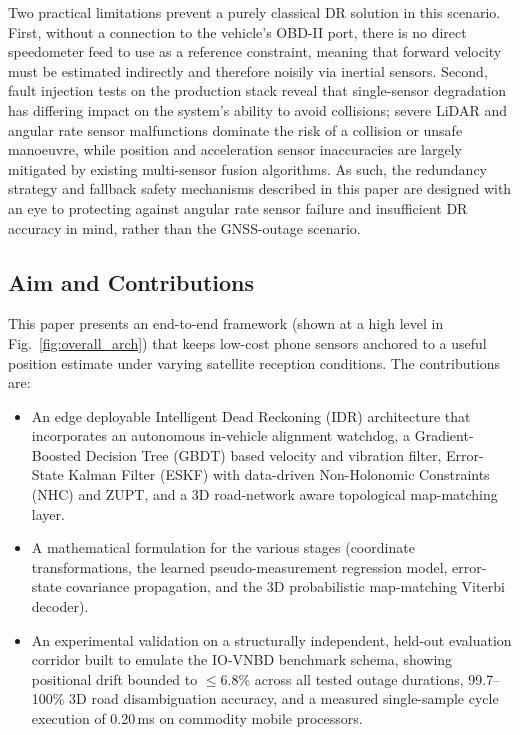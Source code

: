 \documentclass[conference]{IEEEtran}
\begin{document}
Two practical limitations prevent a purely classical DR solution in this scenario. First, without a connection to the vehicle’s OBD-II port, there is no direct speedometer feed to use as a reference constraint, meaning that forward velocity must be estimated indirectly and therefore noisily via inertial sensors. Second, fault injection tests on the production stack reveal that single-sensor degradation has differing impact on the system’s ability to avoid collisions; severe LiDAR and angular rate sensor malfunctions dominate the risk of a collision or unsafe manoeuvre, while position and acceleration sensor inaccuracies are largely mitigated by existing multi-sensor fusion algorithms. As such, the redundancy strategy and fallback safety mechanisms described in this paper are designed with an eye to protecting against angular rate sensor failure and insufficient DR accuracy in mind, rather than the GNSS-outage scenario.



\subsection{Aim and Contributions}

This paper presents an end-to-end framework (shown at a high level in Fig.~\ref{fig:overall_arch}) that keeps low-cost phone sensors anchored to a useful position estimate under varying satellite reception conditions. The contributions are:



\begin{itemize}

\item An edge deployable Intelligent Dead Reckoning (IDR) architecture that incorporates an autonomous in-vehicle alignment watchdog, a Gradient-Boosted Decision Tree (GBDT) based velocity and vibration filter, Error-State Kalman Filter (ESKF) with data-driven Non-Holonomic Constraints (NHC) and ZUPT, and a 3D road-network aware topological map-matching layer.

\item A mathematical formulation for the various stages (coordinate transformations, the learned pseudo-measurement regression model, error-state covariance propagation, and the 3D probabilistic map-matching Viterbi decoder).

\item An experimental validation on a structurally independent, held-out evaluation corridor built to emulate the IO-VNBD benchmark schema, showing positional drift bounded to $\leq$6.8\% across all tested outage durations, 99.7--100\% 3D road disambiguation accuracy, and a measured single-sample cycle execution of 0.20\,ms on commodity mobile processors.

\end{itemize}
\end{document}
